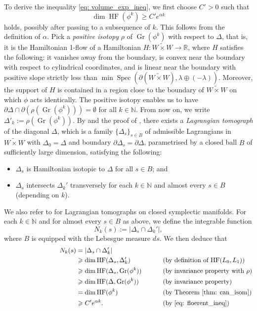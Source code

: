 \documentclass[12pt]{article}
\renewcommand{\ge}{\geqslant}
\theoremstyle{theorem}
\theoremstyle{definition}
\theoremstyle{remark}
\numberwithin{equation}{section}
\newcommand{\p}{\partial}
\newcommand{\R}{{\mathbb{R}}}
\newcommand{\N}{{\mathbb{N}}}
\DeclareMathOperator{\Gr}{Gr}
\DeclareMathOperator{\Spec}{Spec}
\DeclareMathOperator{\HF}{HF}
\begin{document}
To derive the inequality \eqref{eq: volume_exp_ineq}, we first choose $C'>0$ such that
\begin{equation}\label{eq: floerent_ineq}
\dim \HF(\phi^{k}) \ge C'e^{\alpha k}	
\end{equation}
holds, possibly after passing to a subsequence of $k$.
This follows from the definition of $\alpha$.
Pick a \emph{positive isotopy} $\rho$ of $\Gr(\phi^k)$ with respect to $\Delta$, that is, it is the Hamiltonian 1-flow of a Hamiltonian $H\colon \widetilde{W\times W}\to \R$, where $H$ satisfies the following: it vanishes away from the boundary, is convex near the boundary with respect to cylindrical coordinates, and is linear near the boundary with positive slope strictly less than $\min \Spec(\p(\widetilde{W\times W}),\lambda\oplus(-\lambda))$.
Moreover, the support of $H$ is contained in a region close to the boundary of $\widetilde{W\times W}$ on which $\phi$ acts identically.
The positive isotopy enables us to have $\p \Delta\cap \p (\rho(\Gr(\phi^{k})))=\emptyset$ for all $k\in \N$.
From now on, we write $\Delta'_{k}:=\rho(\Gr(\phi^{k}))$.
By \cite[Lemma~3.2]{BaLe25} 
 and the proof of \cite[Theorem 4.1]{BaLe25}, there exists a \emph{Lagrangian tomograph} of the diagonal $\Delta$, which is a family $\{\Delta_s\}_{s\in B}$ of admissible Lagrangians in $\widetilde{W\times W}$ with $\Delta_0=\Delta$ and boundary $\p \Delta_s=\p \Delta$, parametrised by a closed ball $B$ of sufficiently large dimension, satisfying the following:
\begin{itemize}
	\item $\Delta_s$ is Hamiltonian isotopic to $\Delta$ for all $s\in B$; and
	\item $\Delta_s$ intersects $\Delta_k'$ transversely for each $k\in \N$ and almost every $s\in B$ (depending on $k$). 
\end{itemize}
We also refer to \cite[Section~5.2]{CiGiGu21} for Lagrangian tomographs on closed symplectic manifolds.
For each $k\in \N$ and for almost every $s\in B$ as above, we define the integrable function
$$
N_k(s):=|\Delta_s\cap \Delta_k'|,
$$
where $B$ is equipped with the Lebesgue measure $ds$.
We then deduce that
\begin{alignat*}{3}
\hspace{3cm}	N_{k}(s) &=|\Delta_s\cap \Delta'_{k}| && \\
	&\ge \dim \HF(\Delta_s,\Delta'_{k}) \qquad\qquad && (\text{by definition of $\HF(L_0,L_1)$})\\
	&\ge \dim \HF(\Delta_s,\Gr(\phi^{k}))  && (\text{by invariance property with $\rho$})\\
	&\ge \dim \HF(\Delta,\Gr(\phi^{k}))  && (\text{by invariance property})\\
	&= \dim \HF(\phi^{k})  && (\text{by Theorem~\ref{thm: can_isom}})\\
	&\ge C'e^{\alpha k}. && (\text{by \eqref{eq: floerent_ineq}})
\end{alignat*}
\end{document}
